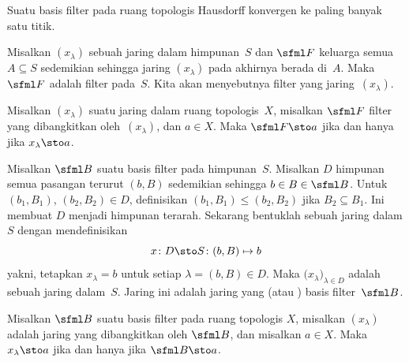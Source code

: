 \begin{prop} Suatu basis filter pada ruang topologis Hausdorff konvergen ke paling banyak satu titik.
\end{prop}

\begin{exam} Misalkan $(x_\lambda)$ sebuah jaring dalam himpunan~$S$ dan $\sfml F$ keluarga semua $A \subseteq S$ sedemikian sehingga jaring $(x_\lambda)$
pada akhirnya berada di~$A$.  Maka $\sfml F$ adalah filter pada~$S$.  Kita akan menyebutnya filter yang
 jaring~$(x_\lambda)$.
\end{exam}

\begin{prop} Misalkan $(x_\lambda)$ suatu jaring dalam ruang topologis~$X$, misalkan $\sfml F$ filter yang dibangkitkan oleh~$(x_\lambda)$,
dan $a \in X$.  Maka $\sfml F \sto a$ jika dan hanya jika $x_\lambda \sto a$.
\end{prop}

\begin{exam} Misalkan $\sfml B$ suatu basis filter pada himpunan~$S$.  Misalkan $D$ himpunan semua pasangan terurut $(b,B)$ sedemikian sehingga $b \in B \in \sfml B$.
Untuk $(b_1,B_1)$, $(b_2,B_2) \in D$, definisikan $(b_1,B_1) \le (b_2,B_2)$ jika $B_2 \subseteq B_1$.  Ini membuat $D$ menjadi himpunan terarah.  Sekarang bentuklah
sebuah jaring dalam $S$ dengan mendefinisikan
   \[ x\colon D \sto S\colon (b,B) \mapsto b \]
yakni, tetapkan $x_\lambda = b$ untuk setiap $\lambda = (b,B) \in D$.  Maka $\bigl(x_\lambda\bigr)_{\lambda \in D}$ adalah sebuah jaring dalam~$S$.  Jaring ini adalah jaring yang
 (atau ) basis filter~$\sfml B$.
\end{exam}

\begin{prop} Misalkan $\sfml B$ suatu basis filter pada ruang topologis $X$, misalkan $(x_\lambda)$ adalah jaring yang dibangkitkan oleh $\sfml B$, dan misalkan $a \in X$.
Maka $x_\lambda \sto a$ jika dan hanya jika $\sfml B \sto a$.
\end{prop}













